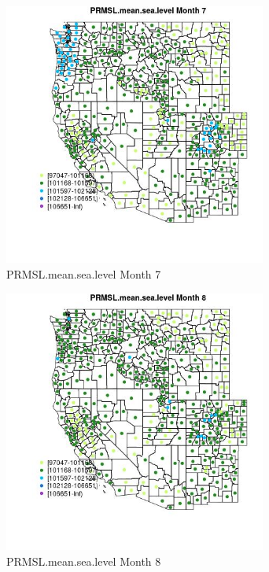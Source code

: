 \begin{figure} 
\centering  
\includegraphics[width=0.77\textwidth]{Code_Outputs/df_report_ML_predictors_CountyCentroid_Locations_Dates_2008-01-01to2018-12-31_MapObsMo7PRMSLmeansealevel.jpg} 
\caption{\label{fig:df_report_ML_predictors_CountyCentroid_Locations_Dates_2008-01-01to2018-12-31MapObsMo7PRMSLmeansealevel}PRMSL.mean.sea.level Month 7} 
\end{figure} 
 

\begin{figure} 
\centering  
\includegraphics[width=0.77\textwidth]{Code_Outputs/df_report_ML_predictors_CountyCentroid_Locations_Dates_2008-01-01to2018-12-31_MapObsMo8PRMSLmeansealevel.jpg} 
\caption{\label{fig:df_report_ML_predictors_CountyCentroid_Locations_Dates_2008-01-01to2018-12-31MapObsMo8PRMSLmeansealevel}PRMSL.mean.sea.level Month 8} 
\end{figure} 
 

